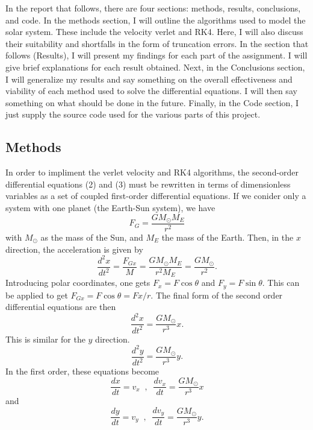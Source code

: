 \documentclass[11pt]{article}
\begin{document}
    In the report that follows, there are four sections: methods, results, conclusions, and code. In the methods section, I will outline the algorithms used to model the solar system. These include the velocity verlet and RK4. Here, I will also discuss their suitability and shortfalls in the form of truncation errors. In the section that follows (Results), I will present my findings for each part of the assignment. I will give brief explanations for each result obtained. Next, in the Conclusions section, I will generalize my results and say something on the overall effectiveness and viability of each method used to solve the differential equations. I will then say something on what should be done in the future. Finally, in the Code section, I just supply the source code used for the various parts of this project.


\subsection{Methods}

    In order to impliment the verlet velocity and RK4 algorithms, the second-order differential equations (2) and (3) must be rewritten in terms of dimensionless variables as a set of coupled first-order differential equations. If we conider only a system with one planet (the Earth-Sun system), we have 
    \begin{equation} F_G = \dfrac{GM_\odot M_E}{r^2} \end{equation}
    with $M_\odot$ as the mass of the Sun, and $M_E$ the mass of the Earth. Then, in the $x$ direction, the acceleration is given by
    \[ \dfrac{d^2x}{dt^2} = \dfrac{F_{Gx}}{M} = \dfrac{GM_\odot M_E}{r^2 M_E} = \dfrac{GM_\odot}{r^2} . \]
    Introducing polar coordinates, one gets $F_x = F \cos{\theta}$ and $F_y = F \sin{\theta}$. This can be applied to get $F_{Gx} = F\cos{\theta} = F x /r$. The final form of the second order differential equations are then
    \begin{equation} \dfrac{d^2x}{dt^2} = \dfrac{GM_\odot}{r^3}x .\end{equation}
    This is similar for the $y$ direction.
    \begin{equation} \dfrac{d^2y}{dt^2} = \dfrac{GM_\odot}{r^3}y .\end{equation}
    In the first order, these equations become
    \begin{equation} \dfrac{dx}{dt} = v_x \;\; , \;\; \dfrac{dv_x}{dt} = \dfrac{GM_\odot}{r^3}x \end{equation}
    and
    \begin{equation} \dfrac{dy}{dt} = v_y \;\; , \;\; \dfrac{dv_y}{dt} = \dfrac{GM_\odot}{r^3}y . \end{equation}
\end{document}
